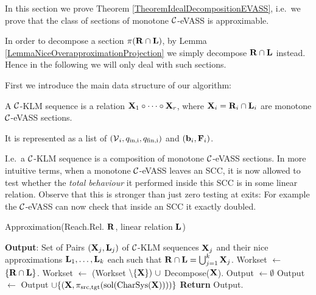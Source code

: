 
In this section we prove Theorem \ref{TheoremIdealDecompositionEVASS}, i.e.\ we prove  that the class of sections of monotone \(\mathcal{C}\)-eVASS is approximable.

In order to decompose a section \(\pi(\mathbf{R} \cap \mathbf{L})\), by Lemma \ref{LemmaNiceOverapproximationProjection} we simply decompose \(\mathbf{R} \cap \mathbf{L}\) instead. Hence in the following we will only deal with such sections.

First we introduce the main data structure of our algorithm:

\begin{definition}
A \(\mathcal{C}\)-KLM sequence is a relation \(\mathbf{X}_1 \circ \dots \circ \mathbf{X}_r\), where \(\mathbf{X}_i=\mathbf{R}_i \cap \mathbf{L}_i\) are monotone \(\mathcal{C}\)-eVASS sections.

It is represented as a list of \((\operatorname{\mathcal{V}}_i, q_{\text{in,i}}, q_{\text{fin,i}})\) and \((\mathbf{b}_i, \mathbf{F}_i)\).
\end{definition}

I.e.\ a \(\mathcal{C}\)-KLM sequence is a composition of monotone \(\mathcal{C}\)-eVASS sections. In more intuitive terms, when a monotone \(\mathcal{C}\)-eVASS leaves an SCC, it is now allowed to test whether the \emph{total behaviour} it performed inside this SCC is in some linear relation. Observe that this is stronger than just zero testing at exits: For example the \(\mathcal{C}\)-eVASS can now check that inside an SCC it exactly doubled. 

\begin{algorithm}[h!]
\caption{Approximation(Reach.Rel. \(\mathbf{R}\), linear relation \(\mathbf{L}\))}\label{AlgorithmMainStructure}
\begin{algorithmic}
\State \textbf{Output}: Set of Pairs \((\mathbf{X}_j, \mathbf{L}_j)\) of \(\mathcal{C}\)-KLM sequences \(\mathbf{X}_j\)
\State and their nice approximations \(\mathbf{L}_1, \dots, \mathbf{L}_k\) each
\State such that \(\mathbf{R} \cap \mathbf{L}= \bigcup_{j=1}^k \mathbf{X}_j\).
\State Workset \(\gets\) \(\{\mathbf{R} \cap \mathbf{L}\}\).
    \State Workset \(\gets\) (Workset \(\setminus \{\vectSet{X}\})\ \cup\) Decompose(\(\mathbf{X}\)).
\EndWhile
\State Output \(\gets \emptyset\)
    \State Output \(\gets\) Output \(\cup \{(\mathbf{X}, \pi_{\operatorname{src}, \operatorname{tgt}}(\operatorname{sol}(\operatorname{CharSys}(\mathbf{X}))))\}\)
\EndFor
\State \textbf{Return} Output.
\end{algorithmic}
\end{algorithm}

